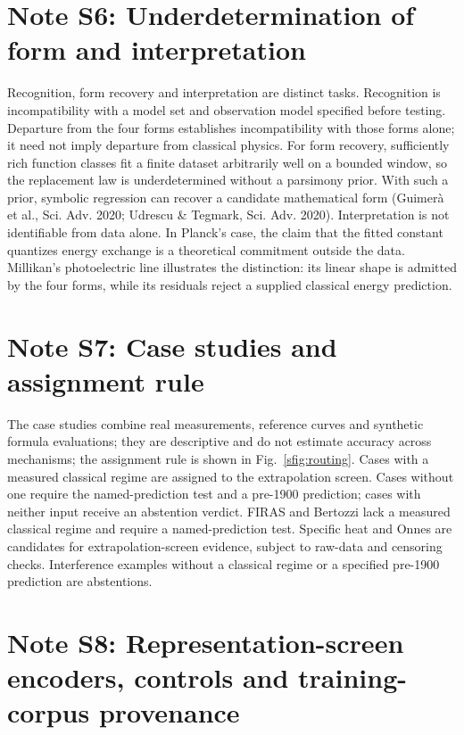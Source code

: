 \documentclass{article}
\begin{document}
\section{Note S6: Underdetermination of form and interpretation}

Recognition, form recovery and interpretation are distinct tasks. Recognition is incompatibility with a model set and observation model specified before testing. Departure from the four forms establishes incompatibility with those forms alone; it need not imply departure from classical physics. For form recovery, sufficiently rich function classes fit a finite dataset arbitrarily well on a bounded window, so the replacement law is underdetermined without a parsimony prior. With such a prior, symbolic regression can recover a candidate mathematical form (Guimer\`a et al., Sci. Adv. 2020; Udrescu \& Tegmark, Sci. Adv. 2020). Interpretation is not identifiable from data alone. In Planck's case, the claim that the fitted constant quantizes energy exchange is a theoretical commitment outside the data. Millikan's photoelectric line illustrates the distinction: its linear shape is admitted by the four forms, while its residuals reject a supplied classical energy prediction.

\section{Note S7: Case studies and assignment rule}

The case studies combine real measurements, reference curves and synthetic formula evaluations; they are descriptive and do not estimate accuracy across mechanisms; the assignment rule is shown in Fig.~\ref{sfig:routing}. Cases with a measured classical regime are assigned to the extrapolation screen. Cases without one require the named-prediction test and a pre-1900 prediction; cases with neither input receive an abstention verdict. FIRAS and Bertozzi lack a measured classical regime and require a named-prediction test. Specific heat and Onnes are candidates for extrapolation-screen evidence, subject to raw-data and censoring checks. Interference examples without a classical regime or a specified pre-1900 prediction are abstentions.

\section{Note S8: Representation-screen encoders, controls and training-corpus provenance}
\end{document}
